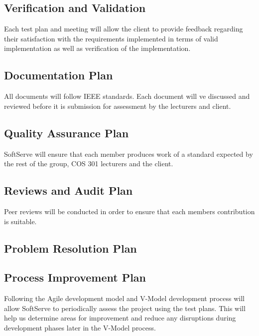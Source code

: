\documentclass[12pt]{article}
\begin{document}
\subsection{Verification and Validation}
Each test plan and meeting will allow the client to provide feedback regarding their satisfaction with the requirements implemented in terms of valid implementation as well as verification of the implementation.
 
\subsection{Documentation Plan}
All documents will follow IEEE standards. Each document will ve discussed and reviewed before it is submission for assessment by the lecturers and client.
 
\subsection{Quality Assurance Plan}
SoftServe will ensure that each member produces work of a standard expected by the rest of the group, COS 301 lecturers and the client.

\subsection{Reviews and Audit Plan}
Peer reviews will be conducted in order to ensure that each members contribution is suitable.

\subsection{Problem Resolution Plan}

\subsection{Process Improvement Plan}
Following the Agile development model and V-Model development process will allow SoftServe to periodically assess the project using the test plans. This will help us determine areas for improvement and reduce any disruptions during development phases later in the V-Model process.

\newpage


\newpage
\end{document}
